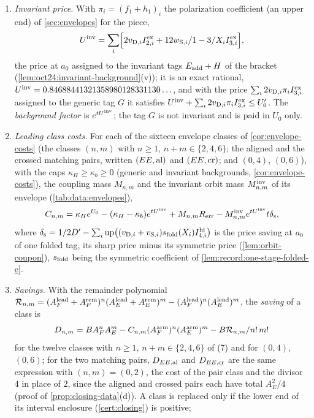 \begin{definition}
\begin{enumerate}[label=(\arabic*)]
\[ \]
\item \emph{Invariant price.} With $\pi_i=(f_1+h_1)_i$ the polarization coefficient (an upper end) of \cref{sec:envelopes} for the piece,
 \[
  \Uinv=\sum_i\Bigl[2v_{{\rm D},i}I^{\rm ex}_{2,i}
  +\frac{12w_{{\rm S},i}}{1-3/X_i}I^{\rm ex}_{3,i}\Bigr],
 \]
 the price at $a_0$ assigned to the invariant tags $E_{\rm add}+H$ of the
 bracket (\cref{lem:oct24:invariant-background}(v)); it is an exact rational,
 $\Uinv=0.84688441321358980128331130\ldots$, and with the price
 $\sum_i2v_{{\rm D},i}\pi_iI^{\rm ex}_{3,i}$ assigned to the generic tag $G$ it
 satisfies $\Uinv+\sum_i2v_{{\rm D},i}\pi_iI^{\rm ex}_{3,i}\le U_0'$. The
 \emph{background factor} is $e^{t\Uinv}$; the tag $G$ is not invariant and is
 paid in $U_0$ only.
\item \emph{Leading class costs.} For each of the sixteen envelope classes of
 \cref{cor:envelope-costs} (the classes $(n,m)$ with $n\ge1$,
 $n+m\in\{2,4,6\}$; the aligned and the crossed matching pairs, written
 $(EE,{\rm al})$ and $(EE,{\rm cr})$; and $(0,4)$, $(0,6)$), with the caps
 $\kappa_H\ge\kappa_b\ge0$ (generic and invariant backgrounds, \cref{cor:envelope-costs}), the coupling mass $M_{n,m}$ and the
 invariant orbit mass $M^{\rm inv}_{n,m}$ of its envelope
 (\cref{tab:data:envelopes}),
 \[
  C_{n,m}=\kappa_He^{U_0}-(\kappa_H-\kappa_b)e^{t\Uinv}+M_{n,m}R_{\rm err}
  -M^{\rm inv}_{n,m}e^{t\Uinv}t\delta_{\rm s},
 \]
 where
 $\delta_{\rm s}=\frac12D'-\sum_i\operatorname{up}\bigl((v_{{\rm D},i}+v_{{\rm S},i})
 s_{\rm fold}(X_i)I^{\rm hi}_{4,i}\bigr)$ is the price saving at $a_0$ of one
 folded tag, its sharp price minus its symmetric price (\cref{lem:orbit-coupon}),
 $s_{\rm fold}$ being the symmetric coefficient of
 \cref{lem:record:one-stage-folded-e}.
\item \emph{Savings.} With the remainder polynomial
 $\mathcal R_{n,m}=(A^{\rm lead}_F+A^{\rm rem}_F)^n(A^{\rm lead}_E+A^{\rm rem}_E)^m
 -(A^{\rm lead}_F)^n(A^{\rm lead}_E)^m$, the \emph{saving} of a class is
 \[
  D_{n,m}=\frac{BA_F^nA_E^m-C_{n,m}(A^{\rm arm}_F)^n(A^{\rm arm}_E)^m
  -B\mathcal R_{n,m}}{n!\,m!}
 \]
 for the twelve classes with $n\ge1$, $n+m\in\{2,4,6\}$ of (7) and for $(0,4)$, $(0,6)$; for the two
 matching pairs, $D_{EE,{\rm al}}$ and $D_{EE,{\rm cr}}$ are the same expression
 with $(n,m)=(0,2)$, the cost of the pair class and the divisor $4$ in place of $2$, since the aligned and crossed pairs each have total $A_E^2/4$ (proof of \cref{prop:closing-data}(d)). A class is replaced only if the lower end of its interval enclosure (\cref{cert:closing}) is positive;

\end{enumerate}
\end{definition}

